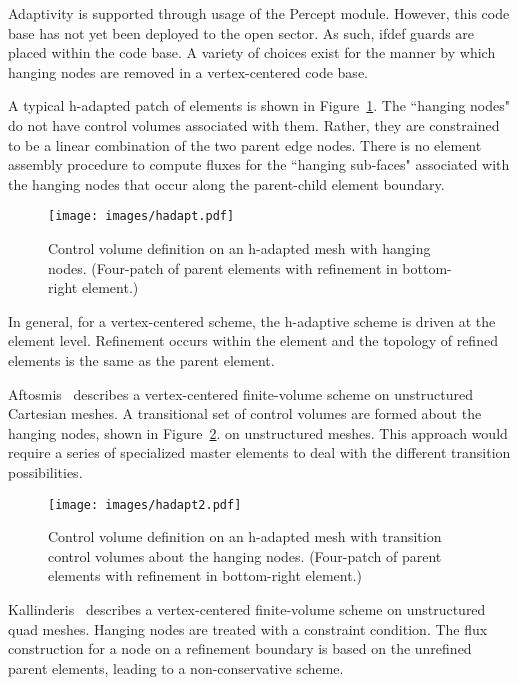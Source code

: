Adaptivity is supported through usage of the Percept module. However, this code base has not yet
been deployed to the open sector. As such, ifdef guards are placed within the code base. A variety of 
choices exist for the manner by which hanging nodes are removed in a vertex-centered code base.

A typical h-adapted patch of elements
is shown in Figure~\ref{hadapt-convol}.  The ``hanging nodes"
do not have control volumes associated with them.  Rather,
they are constrained to be a linear combination of the
two parent edge nodes.  There is no element assembly procedure 
to compute fluxes for the ``hanging sub-faces" associated with the hanging 
nodes that occur along the parent-child element boundary.

\begin{figure}[h]
  \centerline{\texttt{[image: images/hadapt.pdf]}}
  \vspace{0.25in}
  \caption{Control volume definition on an h-adapted mesh
           with hanging nodes. (Four-patch of parent elements 
           with refinement in bottom-right element.) }
  \label{hadapt-convol}
\end{figure}

\noindent
In general, for a vertex-centered scheme, the h-adaptive scheme is driven at the element level.
Refinement occurs within the element and the topology of refined elements is the same as the parent element. 

Aftosmis~\cite{Aftosmis:94} describes a vertex-centered
finite-volume scheme on unstructured Cartesian meshes.
A transitional set of control volumes are formed about
the hanging nodes, shown in Figure~\ref{aftosmis-convol}.  
on unstructured meshes. This approach would require a
series of specialized master elements to deal with the
different transition possibilities.

\begin{figure}[h]
  \centerline{\texttt{[image: images/hadapt2.pdf]}}
  \vspace{0.25in}
  \caption{Control volume definition on an h-adapted mesh
           with transition control volumes about the
           hanging nodes. (Four-patch of parent elements 
           with refinement in bottom-right element.) }
  \label{aftosmis-convol}
\end{figure}

Kallinderis~\cite{Kallinderis:89} describes a vertex-centered
finite-volume scheme on unstructured quad meshes.  Hanging
nodes are treated with a constraint condition.  The flux
construction for a node on a refinement boundary is based
on the unrefined parent elements, leading to a 
non-conservative scheme.

